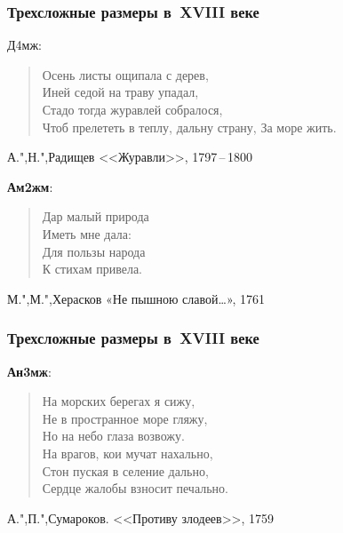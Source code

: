 \documentclass{beamer}
\begin{document}
%
\begin{frame}
\frametitle{Трехсложные размеры в~XVIII веке}

Д4мж:
\begin{verse}
Осень листы ощипала с дерев, \\
Иней седой на траву упадал, \\
Стадо тогда журавлей собралося,\\ 
Чтоб прелететь в теплу, дальну страну, 
За море жить.
\end{verse}
А.",Н.",Радищев <<Журавли>>, 1797\,--\,1800

\begin{flushleft}
\textbf{Ам2жм}:
\end{flushleft}
\begin{verse}
Дар малый природа\\
Иметь мне дала: \\
Для пользы народа\\
К стихам привела. 
\end{verse}
М.",М.",Херасков «Не пышною славой\dots», 1761

\end{frame}




\begin{frame}
\frametitle{Трехсложные размеры в~XVIII веке}

\textbf{Ан3мж}:
\begin{verse}
На морских берегах я сижу,\\ 
Не в пространное море гляжу,\\ 
Но на небо глаза возвожу. \\
На врагов, кои мучат нахально,\\ 
Стон пуская в селение дально, \\
Сердце жалобы взносит печально. 
\end{verse}
А.",П.",Сумароков. <<Противу злодеев>>, 1759

\end{frame}
\end{document}
